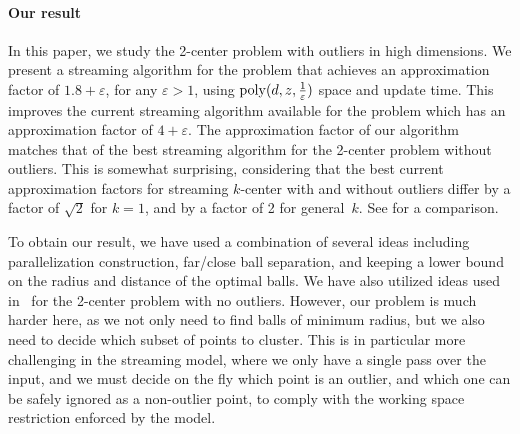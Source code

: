 \documentclass[envcountsame]{cls/cccg15}
\renewcommand{\O}{\ensuremath{{O}}}
\newcommand{\poly}{\mathop{\mathrm{poly}}}
\newcommand{\eps}{\varepsilon}
\newcommand{\REM}[1]{}
\begin{document}
\paragraph{Our result}
In this paper, we study the 2-center problem with outliers in high dimensions.
We present a streaming algorithm for the problem that achieves
an approximation factor of $1.8 + \eps$, for any $\eps > 1$,
using $\poly(d, z, {1 \over \eps})$ space and update time.
This improves the current streaming algorithm available for the problem
which has an approximation factor of $4+\eps$.
The approximation factor of our algorithm matches
that of the best streaming algorithm for the 2-center problem without outliers.
This is somewhat surprising, considering that 
the best current approximation factors for streaming $k$-center with and without outliers 
differ by a factor of $\sqrt{2}$ for $k=1$,
and by a factor of 2  for general~$k$. %
See  for a comparison.

To obtain our result, we have used a combination of several ideas
including parallelization construction, far/close ball separation,
and keeping a lower bound on the radius and distance of the optimal balls.
We have also utilized ideas used in~\cite{kim2014improved} 
for the 2-center problem with no outliers.
However, our problem is much harder here, %
as we not only need to find balls of minimum radius, 
but we also need to decide which subset of points to cluster.
This is in particular more challenging in the streaming model,
where we only have a single pass over the input, and we must decide on the fly
which point is an outlier, 
and which one can be safely ignored as a non-outlier point,
to comply with the working space restriction enforced by the model.


\REM{
The rest of this paper is organized as follows.
In Section~\ref{sec:1-center}, we give a simple $2$-approximation algorithm for 
the 1-center problem with outliers that uses $\O(z^2 + zd)$ space.
In the next section, we show a $(1.8 + \eps)$-approximation
streaming algorithm for 2-center with $z$ outliers in high dimensions. 
}


\end{document}
